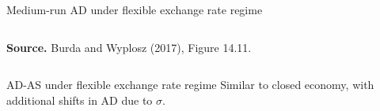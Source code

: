 \documentclass{beamer}
\begin{document}
\begin{frame}{Medium-run AD under flexible exchange rate regime}
\begin{columns}
\begin{minipage}{1.0\columnwidth}
\tiny	
\textbf{Source.} Burda and Wyplosz (2017), Figure 14.11.\\
\end{minipage}
	
\end{columns} 	 
\end{frame}

\begin{frame}{AD-AS under flexible exchange rate regime}
  \vspace{-5cm}
  Similar to closed economy, with additional shifts in AD due to $\sigma$.
\end{frame}
\end{document}

